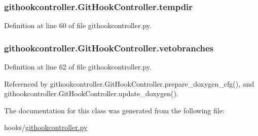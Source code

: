\subsubsection[{tempdir}]{\setlength{\rightskip}{0pt plus 5cm}githookcontroller.\-Git\-Hook\-Controller.\-tempdir}\label{classgithookcontroller_1_1GitHookController_a8ba9332f051b62f8be656967a1607b16}


Definition at line 60 of file githookcontroller.\-py.

\subsubsection[{vetobranches}]{\setlength{\rightskip}{0pt plus 5cm}githookcontroller.\-Git\-Hook\-Controller.\-vetobranches}\label{classgithookcontroller_1_1GitHookController_aef6dc3b539aa239e80317038abe866aa}


Definition at line 62 of file githookcontroller.\-py.



Referenced by githookcontroller.\-Git\-Hook\-Controller.\-prepare\-\_\-doxygen\-\_\-cfg(), and githookcontroller.\-Git\-Hook\-Controller.\-update\-\_\-doxygen().



The documentation for this class was generated from the following file\-:\begin{DoxyCompactItemize}
\item 
hooks/\hyperlink{githookcontroller_8py}{githookcontroller.\-py}\end{DoxyCompactItemize}
